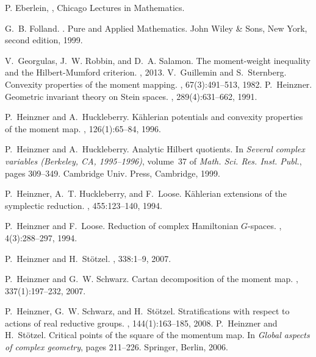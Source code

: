 \documentclass[leqno,11pt, a4]{amsart}
\theoremstyle{named}
\begin{document}
\begin{thebibliography}{10}
 P. Eberlein, , \newblock Chicago Lectures in Mathematics.

 G.~B. Folland.  .  \newblock Pure and Applied Mathematics. John Wiley \&
  Sons, New York, second edition, 1999.

 V.~Georgulas, J.~W. Robbin, and D.~A. Salamon.
  \newblock The moment-weight inequality and the {H}ilbert-{M}umford
  criterion.  , 2013.
 V.~Guillemin and
  S.~Sternberg.  \newblock Convexity properties of the moment mapping.
  , 67(3):491--513, 1982.
 P.~Heinzner.  \newblock Geometric
  invariant theory on {S}tein spaces.  ,
  289(4):631--662, 1991.

 P.~Heinzner and
  A.~Huckleberry.  \newblock K\"ahlerian potentials and convexity
  properties of the moment map.  ,
  126(1):65--84, 1996.

 P.~Heinzner and A.~Huckleberry.
  \newblock Analytic {H}ilbert quotients.  \newblock In {\em Several
    complex variables (Berkeley, CA, 1995--1996)}, volume~37 of {\em
    Math. Sci. Res. Inst. Publ.}, pages 309--349. Cambridge
  Univ. Press, Cambridge, 1999.

 P.~Heinzner, A.~T. Huckleberry,
  and F.~Loose.  \newblock K\"ahlerian extensions of the symplectic
  reduction.  , 455:123--140,
  1994.

 P.~Heinzner and F.~Loose.  \newblock
  Reduction of complex {H}amiltonian {$G$}-spaces.  , 4(3):288--297, 1994.

 P.~Heinzner and H.~St{\"o}tzel.
, 338:1--9, 2007.

 P.~Heinzner and G.~W. Schwarz.
  \newblock Cartan decomposition of the moment map.  , 337(1):197--232, 2007.

 P.~Heinzner, G.~W. Schwarz, and
  H.~St{\"o}tzel.  \newblock Stratifications with respect to actions
  of real reductive groups.  ,
  144(1):163--185, 2008.
 P.~Heinzner and H.~St{\"o}tzel.
  \newblock Critical points of the square of the momentum map.
  \newblock In {\em Global aspects of complex geometry}, pages
  211--226.  Springer, Berlin, 2006.


\end{thebibliography}
\end{document}

